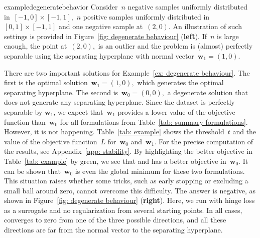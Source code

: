\begin{restatable}{example}{degeneratebehavior}\label{ex: degenerate behaviour}
  Consider~$n$ negative samples uniformly distributed in~$[-1,0]\times[-1,1]$,~$n$ positive samples uniformly distributed in~$[0,1]\times[-1,1]$ and one negative sample at~$(2,0).$ An illustration of such settings is provided in Figure~\ref{fig: degenerate behaviour} (\textbf{left}). If~$n$ is large enough, the point at~$(2,0),$ is an outlier and the problem is (almost) perfectly separable using the separating hyperplane with normal vector~$\bm{w}_1 = (1, 0)$. 
\end{restatable}

There are two important solutions for Example~\ref{ex: degenerate behaviour}. The first is the optimal solution~$\bm{w}_1=(1,0),$ which generates the optimal separating hyperplane. The second is~$\bm{w}_0=(0,0),$ a degenerate solution that does not generate any separating hyperplane. Since the dataset is perfectly separable by $\bm{w}_1$, we expect that~$\bm{w}_1$ provides a lower value of the objective function than~$\bm{w}_0$ for all formulations from Table~\ref{tab: summary formulations}. However, it is not happening. Table~\ref{tab: example} shows the threshold~$t$ and the value of the objective function~$L$ for~$\bm{w}_0$ and~$\bm{w}_1.$ For the precise computation of the results, see Appendix~\ref{app: stability}. By highlighting the better objective in Table~\ref{tab: example} by green, we see that \TopPush and \TopMeanK has a better objective in~$\bm{w}_0.$ It can be shown that~$\bm{w}_0$ is even the global minimum for these two formulations. This situation raises whether some tricks, such as early stopping or excluding a small ball around zero, cannot overcome this difficulty. The answer is negative, as shown in Figure~\ref{fig: degenerate behaviour} (\textbf{right}). Here, we run \TopPush with hinge loss as a surrogate and no regularization from several starting points. In all cases, \TopPush converges to zero from one of the three possible directions, and all these directions are far from the normal vector to the separating hyperplane.

